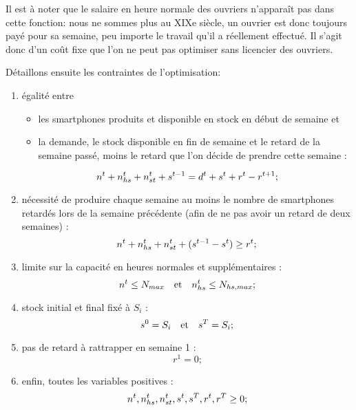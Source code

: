 Il est à noter que le salaire en heure normale des ouvriers n'apparaît pas dans cette fonction: nous ne sommes plus au XIXe siècle, un ouvrier est donc toujours payé pour sa semaine, peu importe le travail qu'il a réellement effectué. Il s'agit donc d'un coût fixe que l'on ne peut pas optimiser sans licencier des ouvriers.

Détaillons ensuite les contraintes de l'optimisation:
\begin{enumerate}
    \item égalité entre
    \begin{itemize}
        \item les smartphones produits et disponible en stock en début de semaine et
        \item la demande, le stock disponible en fin de semaine et le retard de la semaine passé, moins le retard que l'on décide de prendre cette semaine :
    \end{itemize}
    \[
        n^t + n_{hs}^t + n_{st}^t + s^{t-1} = d^t + s^t + r^t - r^{t+1}
        \text;
    \]
    
    \item nécessité de produire chaque semaine au moins le nombre de smartphones retardés lors de la semaine précédente (afin de ne pas avoir un retard de deux semaines) :
    \[
        n^t + n_{hs}^t + n_{st}^t + (s^{t-1} - s^t) \geq r^t
        \text;
    \]
    
    \item limite sur la capacité en heures normales et supplémentaires :
    \[
        n^t \leq N_{max} \quad\text{et}\quad n_{hs}^t \leq N_{hs,max}
        \text;
    \]
    
    \item stock initial et final fixé à $S_i$ :
    \[
        s^0 = S_i \quad\text{et}\quad s^T = S_i
        \text;
    \]
    
    \item pas de retard à rattrapper en semaine 1 :
    \[
        r^1 = 0
        \text{;}
    \]
    
    \item enfin, toutes les variables positives :
    \[
        n^t, n_{hs}^t, n_{st}^t, s^t, s^T, r^t, r^T \geq 0
        \text;
    \]
\end{enumerate}

